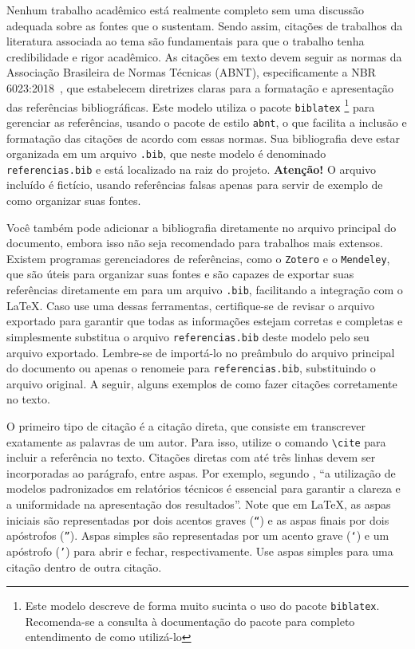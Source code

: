 Nenhum trabalho acadêmico está realmente completo sem uma discussão adequada sobre as fontes que o
sustentam. Sendo assim, citações de trabalhos da literatura associada ao tema são fundamentais para
que o trabalho tenha credibilidade e rigor acadêmico. As citações em texto devem seguir as normas da
Associação Brasileira de Normas Técnicas (ABNT), especificamente a NBR
6023:2018~\cite{nbr6023:2018}, que estabelecem diretrizes claras para a formatação
e apresentação das referências bibliográficas. Este modelo utiliza o pacote \texttt{biblatex}%
%
\footnote{Este modelo descreve de forma muito sucinta o uso do pacote \texttt{biblatex}.
    Recomenda-se a consulta à documentação do pacote para completo entendimento de como utilizá-lo}%
%
 para gerenciar as referências, usando o pacote de estilo \texttt{abnt}, o que facilita a inclusão e
formatação das citações de acordo com essas normas. Sua bibliografia deve estar organizada em um
arquivo \texttt{.bib}, que neste modelo é denominado \texttt{referencias.bib} e está localizado na
raiz do projeto. \textbf{Atenção!}  O arquivo incluído é fictício, usando referências falsas apenas
para servir de exemplo de como organizar suas fontes.

Você também pode adicionar a bibliografia diretamente no arquivo principal do
documento, embora isso não seja recomendado para trabalhos mais extensos. Existem programas
gerenciadores de referências, como o \texttt{Zotero} e o \texttt{Mendeley}, que são úteis para
organizar suas fontes e são capazes de exportar suas referências diretamente em para um arquivo
\texttt{.bib}, facilitando a integração com o \LaTeX. Caso use uma dessas ferramentas, certifique-se
de revisar o arquivo exportado para garantir que todas as informações estejam corretas e completas e
simplesmente substitua o arquivo \texttt{referencias.bib} deste modelo pelo seu arquivo exportado.
Lembre-se de importá-lo no preâmbulo do arquivo principal do documento ou apenas o renomeie para
\texttt{referencias.bib}, substituindo o arquivo original. A seguir, alguns exemplos de como fazer citações corretamente no texto.

O primeiro tipo de citação é a citação direta, que consiste em transcrever exatamente as palavras de
um autor. Para isso, utilize o comando \texttt{\textbackslash cite} para incluir a referência no
texto. Citações diretas com até três linhas devem ser incorporadas ao parágrafo, entre aspas. Por
exemplo, segundo \textcite{fernandes2019}, ``a utilização de modelos padronizados em relatórios
técnicos é essencial para garantir a clareza e a uniformidade na apresentação dos resultados''. Note
que em \LaTeX, as aspas iniciais são representadas por dois acentos graves (\texttt{``}) e as aspas
finais por dois apóstrofos (\texttt{''}). Aspas simples são representadas por um acento grave
(\texttt{`}) e um apóstrofo (\texttt{'}) para abrir e fechar, respectivamente. Use aspas simples
para uma citação dentro de outra citação.

